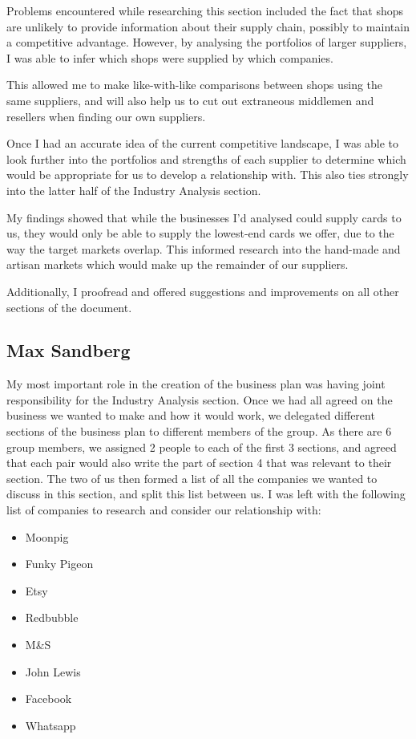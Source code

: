 \documentclass[10pt,a4paper]{article}
\begin{document}
\begin{appendices}
Problems encountered while researching this section included the fact that shops are unlikely to provide information about their supply chain, possibly to maintain a competitive advantage. However, by analysing the portfolios of larger suppliers, I was able to infer which shops were supplied by which companies.

This allowed me to make like-with-like comparisons between shops using the same suppliers, and will also help us to cut out extraneous middlemen and resellers when finding our own suppliers.

Once I had an accurate idea of the current competitive landscape, I was able to look further into the portfolios and strengths of each supplier to determine which would be appropriate for us to develop a relationship with. This also ties strongly into the latter half of the Industry Analysis section.

My findings showed that while the businesses I'd analysed could supply cards to us, they would only be able to supply the lowest-end cards we offer, due to the way the target markets overlap. This informed research into the hand-made and artisan markets which would make up the remainder of our suppliers.

Additionally, I proofread and offered suggestions and improvements on all other sections of the document.

\clearpage
\subsection{Max Sandberg}\label{subsec:maxSandberg}
My most important role in the creation of the business plan was having joint responsibility for the Industry Analysis section. Once we had all agreed on the business we wanted to make and how it would work, we delegated different sections of the business plan to different members of the group. As there are 6 group members, we assigned 2 people to each of the first 3 sections, and agreed that each pair would also write the part of section 4 that was relevant to their section. The two of us then formed a list of all the companies we wanted to discuss in this section, and split this list between us. I was left with the following list of companies to research and consider our relationship with:

\begin{itemize}
	\item Moonpig
	\item Funky Pigeon
	\item Etsy
	\item Redbubble
	\item M\&S
	\item John Lewis
	\item Facebook
	\item Whatsapp
\end{itemize}


\end{appendices}
\end{document}
